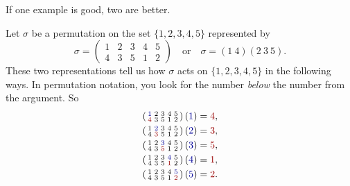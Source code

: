 \documentclass{ximera}
\begin{document}
If one example is good, two are better.

\begin{example}
  Let $\sigma$ be a permutation on the set $\{1,2,3,4,5\}$ represented by
  \[
  \sigma = \left(\begin{smallmatrix}
    1 & 2 & 3 & 4 & 5\\
    4 & 3 & 5 & 1 & 2
  \end{smallmatrix}\right)
  \quad\text{or}\quad \sigma = (1 \ 4) (2 \ 3 \ 5).
  \]
  These two representations tell us how $\sigma$ acts on $\{1,2,3,4,5\}$
  in the following ways. In permutation notation, you look for the
  number \textit{below} the number from the argument. So
  \begin{align*}
    \left(\begin{smallmatrix}
    \textcolor{blue!60!black}1 & 2 & 3 & 4 & 5\\
    \textcolor{red!60!black}{4} & 3 & 5 & 1 & 2
    \end{smallmatrix}\right) (\textcolor{blue!60!black}1) &= \textcolor{red!60!black}{4}, \\
    \left(\begin{smallmatrix}
    1 & \textcolor{blue!60!black}2 & 3 & 4 & 5\\
    4 & \textcolor{red!60!black}3 & 5 & 1 & 2
    \end{smallmatrix}\right) (\textcolor{blue!60!black}2) &= \textcolor{red!60!black}{3}, \\
    \left(\begin{smallmatrix}
      1 & 2 & \textcolor{blue!60!black}3 & 4 & 5\\
      4 & 3 & \textcolor{red!60!black}5  & 1 & 2
    \end{smallmatrix}\right) (\textcolor{blue!60!black}3) &= \textcolor{red!60!black}{5}, \\
    \left(\begin{smallmatrix}
      1 & 2 & 3 & \textcolor{blue!60!black}4 & 5\\
      4 & 3 & 5 & \textcolor{red!60!black}1 & 2
    \end{smallmatrix}\right) (\textcolor{blue!60!black}4) &= \textcolor{red!60!black}{1}, \\
    \left(\begin{smallmatrix}
      1 & 2 & 3 & 4 & \textcolor{blue!60!black}5\\
      4 & 3 & 5 & 1 & \textcolor{red!60!black}2
    \end{smallmatrix}\right) (\textcolor{blue!60!black}5) &= \textcolor{red!60!black}{2}.
  \end{align*}


\end{example}
\end{document}
